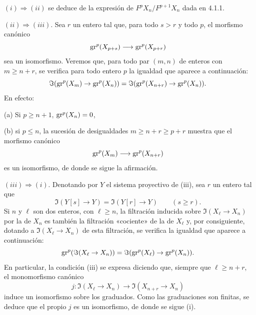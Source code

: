 \begin{prooftext}[Demostración]
$(i)\Rightarrow(ii)$ se deduce de la expresión de $F^pX_n/F^{p+1}X_n$ dada en 4.1.1.

$(ii)\Rightarrow(iii)$. Sea $r$ un entero tal que, para todo $s>r$ y todo $p$, el morfismo canónico
\[
\operatorname{gr}^p(X_{p+s})\longrightarrow \operatorname{gr}^p(X_{p+r})
\]
sea un isomorfismo. Veremos que, para todo par $(m,n)$ de enteros con $m\ge n+r$, se verifica para todo entero $p$ la igualdad que aparece a continuación:
\[
\Im(\operatorname{gr}^p(X_m)\to\operatorname{gr}^p(X_n))=
\Im(\operatorname{gr}^p(X_{n+r})\to\operatorname{gr}^p(X_n)).
\]
En efecto:

(a) Si $p\ge n+1$, $\operatorname{gr}^p(X_n)=0$,

(b) si $p\le n$, la sucesión de desigualdades $m\ge n+r\ge p+r$ muestra que el morfismo canónico
\[
\operatorname{gr}^p(X_m)\longrightarrow\operatorname{gr}^p(X_{n+r})
\]
es un isomorfismo, de donde se sigue la afirmación.

$(iii)\Rightarrow(i)$. Denotando por $Y$ el sistema proyectivo de (iii), sea $r$ un entero tal que
\[
\Im(Y[s]\to Y)=\Im(Y[r]\to Y)\qquad(s\ge r).
\]
Si $n$ y $\ell$ son dos enteros, con $\ell\ge n$, la filtración inducida sobre $\Im(X_\ell\to X_n)$ por la de $X_n$ es también la filtración «cociente» de la de $X_\ell$ y, por consiguiente, dotando a $\Im(X_\ell\to X_n)$ de esta filtración, se verifica la igualdad que aparece a continuación:
\[
\operatorname{gr}^p(\Im(X_\ell\to X_n))=
\Im(\operatorname{gr}^p(X_\ell)\to\operatorname{gr}^p(X_n)).
\]
En particular, la condición (iii) se expresa diciendo que, siempre que $\ell\ge n+r$, el monomorfismo canónico
\[
j:\Im(X_\ell\to X_n)\longrightarrow\Im(X_{n+r}\to X_n)
\]
induce un isomorfismo sobre los graduados. Como las graduaciones son finitas, se deduce que el propio $j$ es un isomorfismo, de donde se sigue (i).
\end{prooftext}

